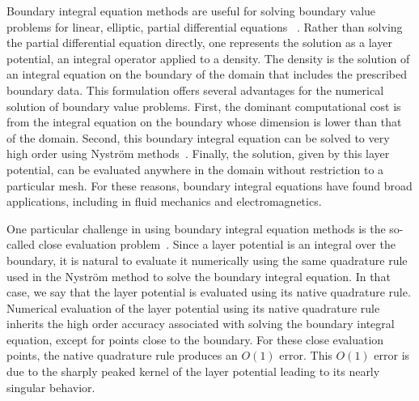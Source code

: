 \documentclass{article}[12pt]
\numberwithin{equation}{section}
\begin{document}
Boundary integral equation methods are useful for solving boundary
value problems for linear, elliptic, partial differential equations
~\cite{guenther1996partial, kress1999linear}. Rather than solving the
partial differential equation directly, one represents the solution as
a layer potential, an integral operator applied to a density. The
density is the solution of an integral equation on the boundary of the
domain that includes the prescribed boundary data.  This formulation
offers several advantages for the numerical solution of boundary value
problems. First, the dominant computational cost is from the integral
equation on the boundary whose dimension is lower than that of the
domain. Second, this boundary integral equation can be solved to very
high order using Nystr\"om methods~\cite{atkinson1997secondkind,
  delves1988computational}. Finally, the solution, given by this layer
potential, can be evaluated anywhere in the domain without restriction
to a particular mesh. For these reasons, boundary integral equations
have found broad applications, including in fluid mechanics and
electromagnetics.

One particular challenge in using boundary integral equation methods
is the so-called close evaluation problem~\cite{barnett2014evaluation,
  helsing2008evaluation}.  Since a layer potential is an integral over
the boundary, it is natural to evaluate it numerically using the same
quadrature rule used in the Nystr\"om method to solve the boundary
integral equation. In that case, we say that the layer potential is
evaluated using its native quadrature rule. Numerical evaluation of
the layer potential using its native quadrature rule inherits the high
order accuracy associated with solving the boundary integral equation,
except for points close to the boundary. For these close evaluation
points, the native quadrature rule produces an $O(1)$ error.  This
$O(1)$ error is due to the sharply peaked kernel of
  the layer potential leading to its nearly singular behavior.
\end{document}
